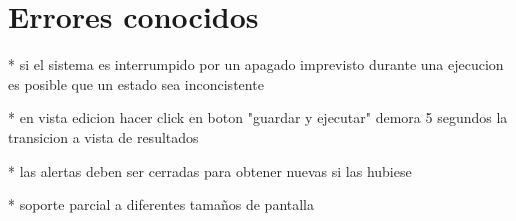 \section{Errores conocidos}





* si el sistema es interrumpido por un apagado imprevisto durante una ejecucion 
    es posible que un estado sea inconcistente

* en vista edicion hacer click en boton "guardar y ejecutar" demora 5 segundos la transicion a 
    vista de resultados

* las alertas deben ser cerradas para obtener nuevas si las hubiese

* soporte parcial a diferentes tamaños de pantalla

\newpage